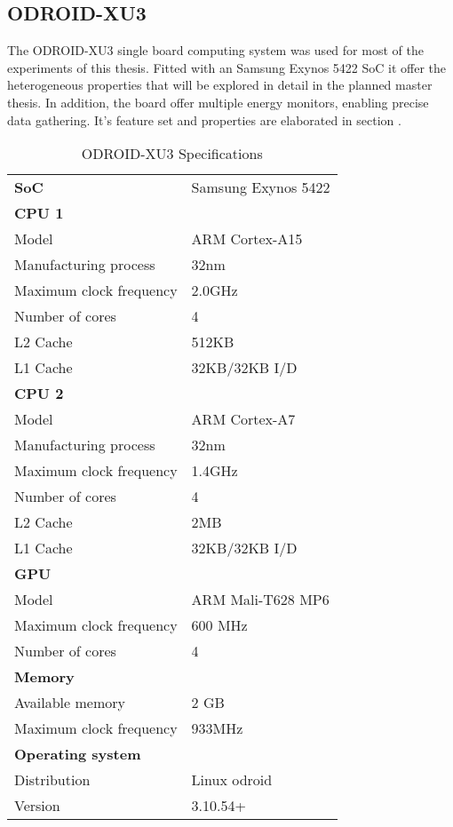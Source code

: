 \subsection{ODROID-XU3}
The ODROID-XU3 single board computing system was used for most of the experiments of this thesis.
Fitted with an Samsung Exynos 5422 SoC it offer the heterogeneous properties that will be explored in detail in the planned master thesis.
In addition, the board offer multiple energy monitors, enabling precise data gathering.
It's feature set and properties are elaborated in section .

\begin{table}[h]
  \begin{tabular}{ll}
    \textbf{SoC}              & Samsung Exynos 5422 \\
    \textbf{CPU 1}            &  \\
    Model                     & ARM Cortex-A15 \\
    Manufacturing process     & 32nm \\
    Maximum clock frequency   & 2.0GHz \\
    Number of cores           & 4 \\
    L2 Cache                  & 512KB \\
    L1 Cache                  & 32KB/32KB I/D \\
    \textbf{CPU 2}            &  \\
    Model                     & ARM Cortex-A7 \\
    Manufacturing process     & 32nm \\
    Maximum clock frequency   & 1.4GHz \\
    Number of cores           & 4 \\
    L2 Cache                  & 2MB \\
    L1 Cache                  & 32KB/32KB I/D \\
    \textbf{GPU}              &  \\
    Model                     & ARM Mali-T628 MP6 \\
    Maximum clock frequency   & 600 MHz \\
    Number of cores           & 4 \\
    \textbf{Memory}           &  \\
    Available memory          & 2 GB \\
    Maximum clock frequency   & 933MHz \\
    \textbf{Operating system} &  \\
    Distribution              & Linux odroid \\
    Version                   & 3.10.54+
  \end{tabular}
  \caption{ODROID-XU3 Specifications\label{overflow}}
\end{table}


